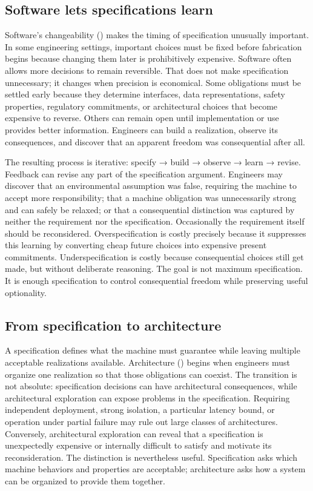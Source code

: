 \subsection{Software lets specifications learn}\label{sec-specifications-learn}

Software's changeability (\citet{ch-software-engineering}) makes the timing of specification unusually
important. In some engineering settings, important choices must be fixed before fabrication begins
because changing them later is prohibitively expensive. Software often allows more decisions to
remain reversible. That does not make specification unnecessary; it changes when precision is
economical. Some obligations must be settled early because they determine interfaces, data
representations, safety properties, regulatory commitments, or architectural choices that become
expensive to reverse. Others can remain open until implementation or use provides better
information. Engineers can build a realization, observe its consequences, and discover that an
apparent freedom was consequential after all.

The resulting process is iterative: specify → build → observe → learn → revise. Feedback can revise
any part of the specification argument. Engineers may discover that an environmental assumption was
false, requiring the machine to accept more responsibility; that a machine obligation was
unnecessarily strong and can safely be relaxed; or that a consequential distinction was captured by
neither the requirement nor the specification. Occasionally the requirement itself should be
reconsidered. Overspecification is costly precisely because it suppresses this learning by
converting cheap future choices into expensive present commitments. Underspecification is costly
because consequential choices still get made, but without deliberate reasoning. The goal is not
maximum specification. It is enough specification to control consequential freedom while preserving
useful optionality.

\subsection{From specification to architecture}\label{sec-to-architecture}

A specification defines what the machine must guarantee while leaving multiple acceptable
realizations available. Architecture (\citet{ch-architecture}) begins when engineers must organize one
realization so that those obligations can coexist. The transition is not absolute: specification
decisions can have architectural consequences, while architectural exploration can expose problems
in the specification. Requiring independent deployment, strong isolation, a particular latency
bound, or operation under partial failure may rule out large classes of architectures. Conversely,
architectural exploration can reveal that a specification is unexpectedly expensive or internally
difficult to satisfy and motivate its reconsideration. The distinction is nevertheless useful.
Specification asks which machine behaviors and properties are acceptable; architecture asks how a
system can be organized to provide them together.


